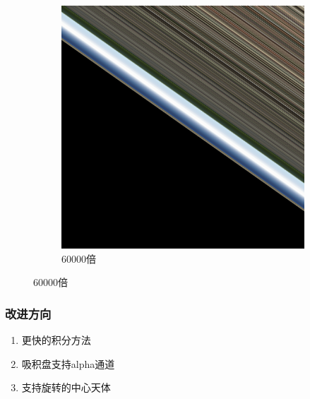 \documentclass{beamer}
\begin{document}
\begin{frame}
\begin{figure}[H]
        \begin{subfigure}{.33\textwidth}
            \centering
            \includegraphics[width=.8\linewidth]{images/zoomin_60000x.png}
            \caption{60000倍}
            \label{fig:blackness_test}
        \end{subfigure}
    \end{figure}

\end{frame}


\begin{frame}
    \frametitle{改进方向}
    \begin{enumerate}
        \item 更快的积分方法
        \item 吸积盘支持alpha通道
        \item 支持旋转的中心天体
    \end{enumerate}

\end{frame}

\end{document}
